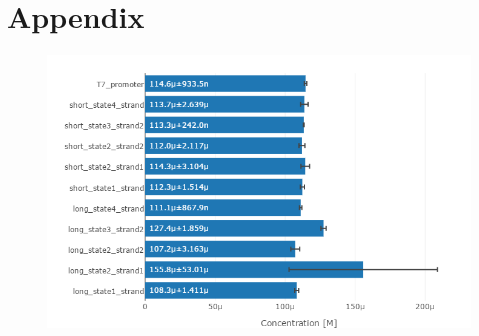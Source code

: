 \section{Appendix}

\begin{figure}[H]
\centering
\includegraphics[width=\columnwidth]{images/oligo_concentrations.png}
\caption{}
\label{oligo_concentrations}
\end{figure}


